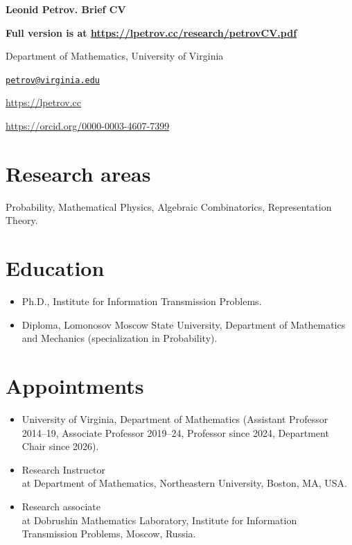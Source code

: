 \documentclass[letterpaper,11pt]{article}
\def\name{Leonid Petrov}
\begin{document}
\centerline{\huge \bf \name . Brief CV}
\bigskip

\textbf{Full version is at \url{https://lpetrov.cc/research/petrovCV.pdf}}

\noindent\hrulefill

\vspace{0.25in}

Department of Mathematics, University of Virginia

\href{mailto:petrov@virginia.edu}{\tt petrov@virginia.edu}

\url{https://lpetrov.cc}

\url{https://orcid.org/0000-0003-4607-7399}

\section*{Research areas}

Probability, Mathematical Physics, Algebraic Combinatorics, Representation
Theory.

\section*{Education}

\begin{itemize}
	\item [2010:]
		Ph.D.,
		Institute for Information Transmission Problems.

	\item [2007:]
		Diploma,
		Lomonosov Moscow State University,
		Department of Mathematics and Mechanics (specialization in Probability).
\end{itemize}

\section*{Appointments}

\begin{itemize}
	\item
	[Since 2014:]
	University of Virginia, Department of Mathematics
	(Assistant Professor 2014--19, Associate Professor 2019--24, Professor since 2024, Department Chair since 2026).
	\item
	      [2011--2014:]
	      Research Instructor\\ at Department of Mathematics, Northeastern
	      University, Boston, MA, USA.
	\item
	      [2009--2011:]
	      Research associate\\ at Dobrushin Mathematics Laboratory,
	      Institute for Information Transmission Problems, Moscow, Russia.
\end{itemize}
\end{document}
